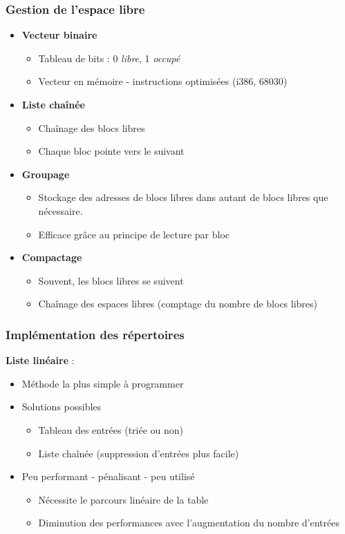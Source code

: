 \begin{frame}
\frametitle{Gestion de l'espace libre}
\begin{itemize}
\item \textbf{Vecteur binaire}
\begin{itemize}
\item Tableau de bits : 0 \textit{libre}, 1 \textit{occupé}
\item Vecteur en mémoire - instructions optimisées (i386, 68030)
\end{itemize}
\item \textbf{Liste chaînée}
\begin{itemize}
\item Chaînage des blocs libres
\item Chaque bloc pointe vers le suivant
\end{itemize}
\item \textbf{Groupage}
\begin{itemize}
\item Stockage des adresses de blocs libres dans autant de blocs libres que nécessaire.
\item Efficace grâce au principe de lecture par bloc
\end{itemize}
\item \textbf{Compactage}
\begin{itemize}
\item Souvent, les blocs libres se suivent
\item Chaînage des espaces libres (comptage du nombre de blocs libres)
\end{itemize}
\end{itemize}
\end{frame}

\begin{frame}
\frametitle{Implémentation des répertoires}
\textbf{Liste linéaire} :
\begin{itemize}
\item Méthode la plus simple à programmer
\item Solutions possibles
\begin{itemize}
\item Tableau des entrées (triée ou non)
\item Liste chaînée (suppression d'entrées plus facile)
\end{itemize}
\item Peu performant - pénalisant - peu utilisé
\begin{itemize}
\item Nécessite le parcours linéaire de la table
\item Diminution des performances avec l'augmentation du nombre d'entrées
\end{itemize}
\end{itemize}
\end{frame}

